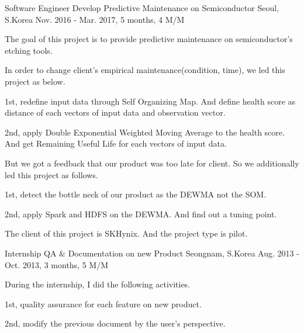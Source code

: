 \begin{cventries}
  \cventry
    {Software Engineer} %
    {Develop Predictive Maintenance on Semiconductor} %
    {Seoul, S.Korea} %
    {Nov. 2016 - Mar. 2017, 5 months, 4 M/M} %
    {
      \begin{cvitems} %
        \item {The goal of this project is to provide predictive maintenance on semiconductor's etching tools.}
        \item {In order to change client's empirical maintenance(condition, time), we led this project as below.}
        \item {1st, redefine input data through Self Organizing Map. And define health score as distance of each vectors of input data and observation vector.}
        \item {2nd, apply Double Exponential Weighted Moving Average to the health score. And get Remaining Useful Life for each vectors of input data.}
        \item {But we got a feedback that our product was too late for client. So we additionally led this project as follows.}
        \item {1st, detect the bottle neck of our product as the DEWMA not the SOM.}
        \item {2nd, apply Spark and HDFS on the DEWMA. And find out a tuning point.}
        \item {The client of this project is SKHynix. And the project type is pilot.}
      \end{cvitems}
    }

  \cventry
    {Internship} %
    {QA \& Documentation on new Product} %
    {Seongnam, S.Korea} %
    {Aug. 2013 - Oct. 2013, 3 months, 5 M/M} %
    {
      \begin{cvitems} %
        \item {During the internship, I did the following activities.}
        \item {1st, quality assurance for each feature on new product.}
        \item {2nd, modify the previous document by the user's perspective.}
      \end{cvitems}
    }

\end{cventries}
